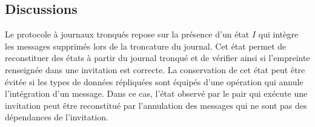 








\subsection{Discussions}

Le protocole à journaux tronqués repose sur la présence d'un état $I$ qui intègre les messages supprimés lors de la troncature du journal.
Cet état permet de reconstituer des états à partir du journal tronqué et de vérifier ainsi si l'empreinte renseignée dans une invitation est correcte.
La conservation de cet état peut être évitée si les types de données répliquées sont équipés d'une opération qui annule l'intégration d'un message.
Dans ce cas, l'état observé par le pair qui exécute une invitation peut être reconstitué par l'annulation des messages qui ne sont pas des dépendances de l'invitation.

